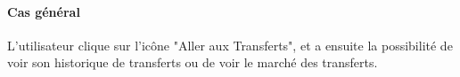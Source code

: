 \paragraph{Cas général}
L'utilisateur clique sur l'icône "Aller aux Transferts", et a ensuite la possibilité de voir son historique de transferts ou de voir le marché des transferts.


